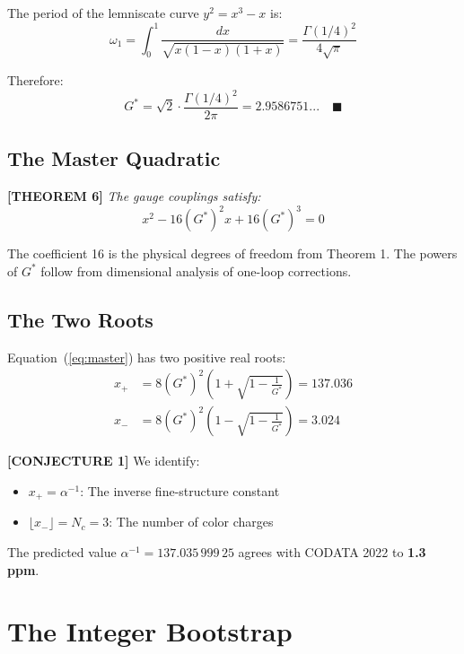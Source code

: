 \documentclass[aps,prd,twocolumn,10pt,groupedaddress,superscriptaddress]{revtex4-2}
\begin{document}
The period of the lemniscate curve $y^2 = x^3 - x$ is:
\begin{equation}
\omega_1 = \int_0^1 \frac{dx}{\sqrt{x(1-x)(1+x)}} = \frac{\Gamma(1/4)^2}{4\sqrt{\pi}}
\end{equation}

Therefore:
\begin{equation}
G^* = \sqrt{2} \cdot \frac{\Gamma(1/4)^2}{2\pi} = 2.9586751... \quad \blacksquare
\end{equation}

\subsection{The Master Quadratic}

\textbf{[THEOREM 6]} \textit{The gauge couplings satisfy:}
\begin{equation}\label{eq:master}
x^2 - 16(G^*)^2 x + 16(G^*)^3 = 0
\end{equation}

The coefficient 16 is the physical degrees of freedom from Theorem 1. The powers of $G^*$ follow from dimensional analysis of one-loop corrections.

\subsection{The Two Roots}

Equation~(\ref{eq:master}) has two positive real roots:
\begin{align}
x_+ &= 8(G^*)^2\left(1 + \sqrt{1 - \frac{1}{G^*}}\right) = 137.036 \\
x_- &= 8(G^*)^2\left(1 - \sqrt{1 - \frac{1}{G^*}}\right) = 3.024
\end{align}

\textbf{[CONJECTURE 1]} We identify:
\begin{itemize}
\item $x_+ = \alpha^{-1}$: The inverse fine-structure constant
\item $\lfloor x_- \rfloor = N_c = 3$: The number of color charges
\end{itemize}

The predicted value $\alpha^{-1} = 137.035\,999\,25$ agrees with CODATA 2022 to \textbf{1.3 ppm}.

\section{The Integer Bootstrap}
\end{document}
